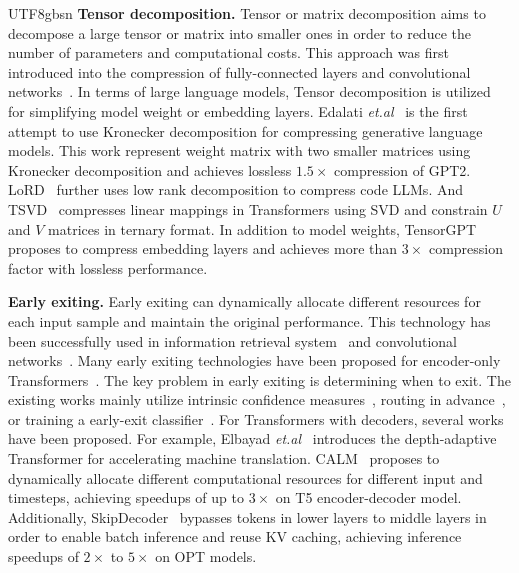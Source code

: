 \documentclass[10pt,journal,compsoc]{IEEEtran}
\newcommand{\<}{\left\langle}
\renewcommand{\>}{\right\rangle}
\newcommand{\1}{\mathbbm{1}}
\begin{document}
\begin{CJK}{UTF8}{gbsn}
\noindent\textbf{Tensor decomposition.}
Tensor or matrix decomposition aims to decompose a large tensor or matrix into smaller ones in order to reduce the number of parameters and computational costs. This approach was first introduced into the compression of fully-connected layers and convolutional networks~\cite{denil2013predicting,jaderberg2014speeding}. In terms of large language models, Tensor decomposition is utilized for simplifying model weight or embedding layers. 
Edalati \emph{et.al}~\cite{edalati2022kronecker} is the first attempt to use Kronecker decomposition
for compressing generative language models. This work represent weight matrix with two smaller matrices using Kronecker decomposition and achieves lossless $1.5\times$ compression of GPT2. LoRD~\cite{kaushal2023lord} further uses low rank decomposition to compress code LLMs. And TSVD~\cite{chen2023ternary} compresses linear mappings in Transformers using SVD and constrain $U$ and $V$ matrices in ternary format. In addition to model weights, TensorGPT~\cite{xu2023tensorgpt} proposes to compress embedding layers and achieves more than $3\times$ compression factor with lossless performance.

\noindent\textbf{Early exiting.}
Early exiting can dynamically allocate different resources for each input sample and maintain the original performance. This technology has been successfully used in information retrieval system~\cite{cambazoglu2010early} and convolutional networks~\cite{teerapittayanon2016branchynet}. Many early exiting technologies have been proposed for encoder-only Transformers~\cite{stickland2019bert,schwartz2020right,liu2020fastbert,hou2020dynabert}. The key problem in early exiting is determining when to exit. The existing works mainly utilize intrinsic confidence measures~\cite{stickland2019bert}, routing in advance~\cite{liu2021faster}, or training a early-exit classifier~\cite{schuster2021consistent}. For Transformers with decoders, several works have been proposed. For example, Elbayad \emph{et.al}~\cite{elbayad2020depth} introduces the depth-adaptive Transformer for accelerating machine translation. 
CALM~\cite{schuster2022confident} proposes to dynamically allocate different computational resources for different input and timesteps, achieving speedups of up to $3\times$ on T5 encoder-decoder model. Additionally, SkipDecoder~\cite{del2023skipdecode} bypasses tokens in lower layers to middle layers in order to enable batch inference and reuse KV caching, achieving inference speedups of $2\times$ to $5\times$ on OPT models. 


\end{CJK}
\end{document}
